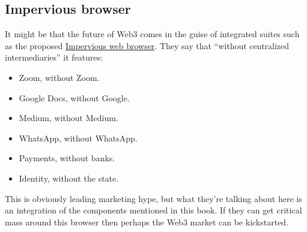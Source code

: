 \subsection{Impervious browser}
It might be that the future of Web3 comes in the guise of integrated suites such as the proposed \href{https://newsletter.impervious.ai/impervious-browser-functionality-overview/}{Impervious web browser}. They say that ``without centralized intermediaries'' it features:
\begin{itemize}
\item    Zoom, without Zoom.
\item    Google Docs, without Google.
\item    Medium, without Medium.
\item    WhatsApp, without WhatsApp.
\item    Payments, without banks.
\item    Identity, without the state.
\end{itemize}
This is obviously leading marketing hype, but what they're talking about here is an integration of the components mentioned in this book. If they can get critical mass around this browser then perhaps the Web3 market can be kickstarted.
